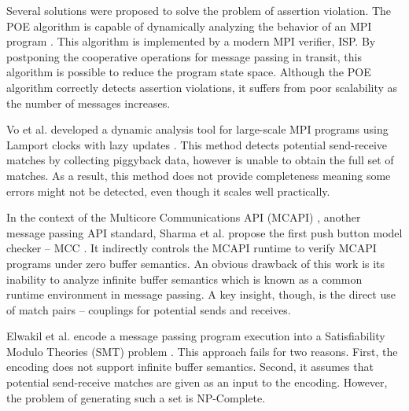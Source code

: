 
Several solutions were proposed to solve the problem of assertion violation. The POE algorithm is capable of dynamically analyzing the behavior of an MPI program \cite{DBLP:conf/ppopp/VakkalankaSGK08}. This algorithm is implemented by a modern MPI verifier, ISP. By postponing the cooperative operations for message passing in transit, this algorithm is possible to reduce the program state space. Although the POE algorithm correctly detects assertion violations, it suffers from poor scalability as the number of messages increases. 

Vo et al. developed a dynamic analysis tool for large-scale MPI programs using Lamport clocks with lazy updates \cite{DBLP:conf/sc/VoAGSSB10,DBLP:conf/IEEEpact/VoGKSSB11}. This method detects potential send-receive matches by collecting piggyback data, however is unable to obtain the full set of matches. As a result, this method does not provide completeness meaning some errors might not be detected, even though it scales well practically.

In the context of the Multicore Communications API (MCAPI) \cite{mcapi}, another message passing API standard, Sharma et al. propose the first push button model checker -- MCC \cite{DBLP:conf/fmcad/SharmaGMH09}. It indirectly controls the MCAPI runtime to verify MCAPI programs under zero buffer semantics. An obvious drawback of this work is its inability to analyze infinite buffer semantics which is known as a common runtime environment in message passing. A key insight, though, is the direct use of match pairs -- couplings for potential sends and receives.

Elwakil et al. encode a message passing program execution into a Satisfiability Modulo Theories (SMT) problem  \cite{barrett2008satisfiability} \cite{DBLP:conf/issta/ElwakilY10,DBLP:conf/atva/ElwakilYW10}. This approach fails for two reasons. First, the encoding does not support infinite buffer semantics. Second, it assumes that potential send-receive matches are given as an input to the encoding. However, the problem of generating such a set is NP-Complete.

